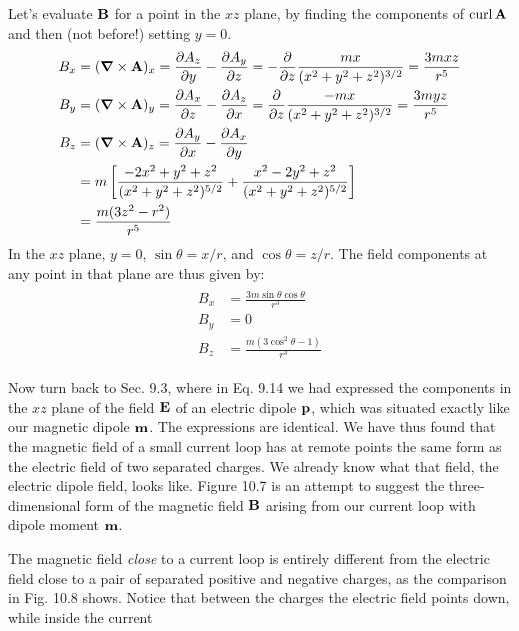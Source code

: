 Let's evaluate $\mathbf{B}$ for a point in the $xz$ plane, by finding the components
of $\operatorname{curl}\mathbf{A}$ and then (not before!) setting $y = 0$.
\begin{align}
\begin{split}
  B_x &= (\boldsymbol{\nabla}\times\mathbf{A})_x 
       = \frac{\partial A_z}{\partial y} - \frac{\partial A_y}{\partial z} 
       = -\frac{\partial}{\partial z} \frac{mx}{(x^2+y^2+z^2)^{3/2}}
       = \frac{3mxz}{r^5} \\
  B_y &= (\boldsymbol{\nabla}\times\mathbf{A})_y
       = \frac{\partial A_x}{\partial z} - \frac{\partial A_z}{\partial x} 
       = \frac{\partial}{\partial z} \frac{-mx}{(x^2+y^2+z^2)^{3/2}}
       = \frac{3myz}{r^5} \\
  B_z &= (\boldsymbol{\nabla}\times\mathbf{A})_z
       = \frac{\partial A_y}{\partial x} - \frac{\partial A_x}{\partial y} \\
       &= m\left[
                 \frac{-2x^2+y^2+z^2}{(x^2+y^2+z^2)^{5/2}}
                +\frac{x^2-2y^2+z^2}{(x^2+y^2+z^2)^{5/2}}
          \right]\\
       &= \frac{m(3z^2-r^2)}{r^5}
\end{split}
\end{align}
In the $xz$ plane, $y = 0$, $\sin \theta = x/r$, and $\cos \theta = z/r$. The field components
at any point in that plane are thus given by:
\begin{align}
\begin{split}
  B_x &= \frac{3m\sin\theta\cos\theta}{r^3} \\
  B_y &= 0 \\
  B_z &= \frac{m(3\cos^2\theta-1)}{r^3} 
\end{split}
\end{align}

Now turn back to Sec. 9.3, where in Eq. 9.14 we had expressed
the components in the $xz$ plane of the field $\mathbf{E}$ of an electric dipole $\mathbf{p}$,
which was situated exactly like our magnetic dipole $\mathbf{m}$. The expressions
are identical. We have thus found that the magnetic field of a
small current loop has at remote points the same form as the electric
field of two separated charges. We already know what that field,
the electric dipole field, looks like. Figure 10.7 is an attempt to
suggest the three-dimensional form of the magnetic field $\mathbf{B}$ arising
from our current loop with dipole moment $\mathbf{m}$.


The magnetic field \emph{close} to a current loop is entirely different from
the electric field close to a pair of separated positive and negative
charges, as the comparison in Fig. 10.8 shows. Notice that between
the charges the electric field points down, while inside the current

